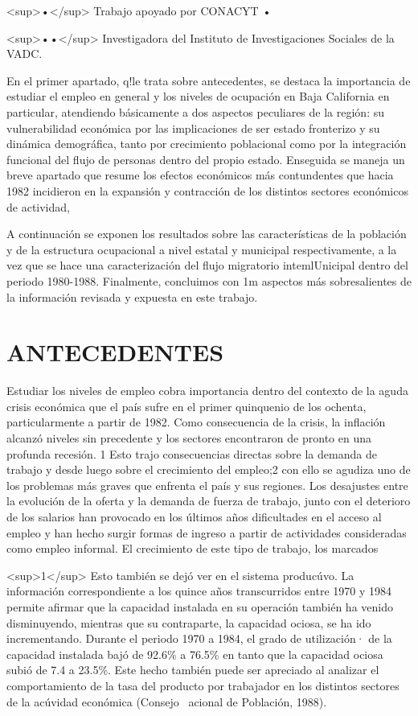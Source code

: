 \documentclass{article}
\begin{document}
<sup>•</sup> Trabajo apoyado por CONACYT •

<sup>••</sup> Investigadora del Instituto de Investigaciones Sociales de la VADC.

En el primer apartado, q!le trata sobre antecedentes, se destaca la importancia de estudiar el empleo en general y los niveles de ocupación en Baja California en particular, atendiendo básicamente a dos aspectos peculiares de la región: su vulnerabilidad económica por las implicaciones de ser estado fronterizo y su dinámica demográfica, tanto por crecimiento poblacional como por la integración funcional del flujo de personas dentro del propio estado. Enseguida se maneja un breve apartado que resume los efectos económicos más contundentes que hacia 1982 incidieron en la expansión y contracción de los distintos sectores económicos de actividad,

A continuación se exponen los resultados sobre las características de la población y de la estructura ocupacional a nivel estatal y municipal respectivamente, a la vez que se hace una caracterización del flujo migratorio intemlUnicipal dentro del periodo 1980-1988. Finalmente, concluimos con 1m aspectos más sobresalientes de la información revisada y expuesta en este trabajo.

\section{ANTECEDENTES}

Estudiar los niveles de empleo cobra importancia dentro del contexto de la aguda crisis económica que el país sufre en el primer quinquenio de los ochenta, particularmente a partir de 1982. Como consecuencia de la crisis, la inflación alcanzó niveles sin precedente y los sectores encontraron de pronto en una profunda recesión. 1 Esto trajo consecuencias directas sobre la demanda de trabajo y desde luego sobre el crecimiento del empleo;2 con ello se agudiza uno de los problemas más graves que enfrenta el país y sus regiones. Los desajustes entre la evolución de la oferta y la demanda de fuerza de trabajo, junto con el deterioro de los salarios han provocado en los últimos años dificultades en el acceso al empleo y han hecho surgir formas de ingreso a partir de actividades consideradas como empleo informal. El crecimiento de este tipo de trabajo, los marcados

<sup>1</sup> Esto también se dejó ver en el sistema producúvo. La información correspondiente a los quince años transcurridos entre 1970 y 1984 permite afirmar que la capacidad instalada en su operación también ha venido disminuyendo, mientras que su contraparte, la capacidad ociosa, se ha ido incrementando. Durante el periodo 1970 a 1984, el grado de utilización· de la capacidad instalada bajó de 92.6\% a 76.5\% en tanto que la capacidad ociosa subió de 7.4 a 23.5\%. Este hecho también puede ser apreciado al analizar el comportamiento de la tasa del producto por trabajador en los distintos sectores de la acúvidad económica (Consejo ~acional de Población, 1988).
\end{document}
